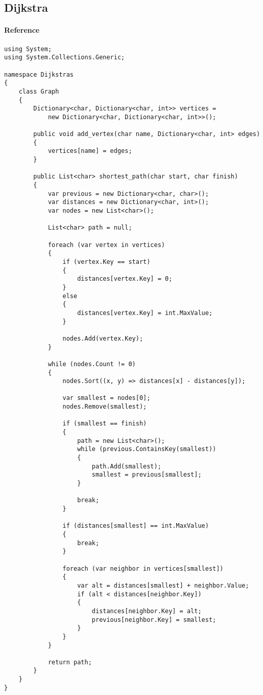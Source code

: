 \newpage
\subsection{Dijkstra}
\paragraph{Reference} \cite{Algorithm3}
\begin{lstlisting}
using System;
using System.Collections.Generic;

namespace Dijkstras
{
    class Graph
    {
        Dictionary<char, Dictionary<char, int>> vertices =
            new Dictionary<char, Dictionary<char, int>>();

        public void add_vertex(char name, Dictionary<char, int> edges)
        {
            vertices[name] = edges;
        }

        public List<char> shortest_path(char start, char finish)
        {
            var previous = new Dictionary<char, char>();
            var distances = new Dictionary<char, int>();
            var nodes = new List<char>();

            List<char> path = null;

            foreach (var vertex in vertices)
            {
                if (vertex.Key == start)
                {
                    distances[vertex.Key] = 0;
                }
                else
                {
                    distances[vertex.Key] = int.MaxValue;
                }

                nodes.Add(vertex.Key);
            }

            while (nodes.Count != 0)
            {
                nodes.Sort((x, y) => distances[x] - distances[y]);

                var smallest = nodes[0];
                nodes.Remove(smallest);

                if (smallest == finish)
                {
                    path = new List<char>();
                    while (previous.ContainsKey(smallest))
                    {
                        path.Add(smallest);
                        smallest = previous[smallest];
                    }

                    break;
                }

                if (distances[smallest] == int.MaxValue)
                {
                    break;
                }

                foreach (var neighbor in vertices[smallest])
                {
                    var alt = distances[smallest] + neighbor.Value;
                    if (alt < distances[neighbor.Key])
                    {
                        distances[neighbor.Key] = alt;
                        previous[neighbor.Key] = smallest;
                    }
                }
            }

            return path;
        }
    }
}
\end{lstlisting}

